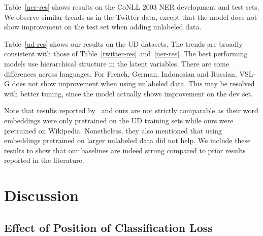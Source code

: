 \documentclass[11pt,a4paper]{article}
\newcommand{\qtcomment}[1]{\textcolor{blue}{\bf \small [ #1 --QT]}}
\renewcommand{\qtcomment}[1]{}
\newcommand{\vsmg}{VSL-G\xspace}
\begin{document}
Table~\ref{ner-res} shows results on the CoNLL 2003 NER development and test sets. We observe similar trends as in the Twitter data, except that the model does not show improvement on the test set when adding unlabeled data.

Table~\ref{ud-res} shows our results on the UD datasets. The trends are broadly consistent with those of Table~\ref{twitter-res} and~\ref{ner-res}. The best performing models use hierarchical structure in the latent variables.
There are some differences across languages. For French, German, Indonesian and Russian, \vsmg does not show improvement when using unlabeled data. This may be resolved with better tuning, since the model actually shows improvement on the dev set.


Note that results reported by~\citet{zhang2017semi} and ours are not strictly comparable as their word embeddings were only pretrained on the UD training sets while ours were pretrained on Wikipedia. Nonetheless, they also mentioned that using embeddings pretrained on larger unlabeled data did not help. We include these results to show that our baselines are indeed strong compared to prior results reported in the literature.

\section{Discussion}
\qtcomment{The discussion part looks interesting to me. I would suggest to put subsection ~\ref{subsec:discuss-multi-task} behind subsection ~\ref{subsec:discuss-latent-hierarchy}. The logic is single-flat-hierarchy-different positions in hierarchy}

\subsection{Effect of Position of Classification Loss
\label{subsec:discuss-multi-task}}
\end{document}
